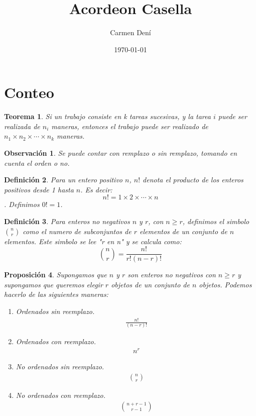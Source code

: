 \documentclass[14pt]{extarticle}
\title{Acordeon Casella}
\author{Carmen Dení}
\date{\today}
\newtheorem{theorem}{Teorema}[section]
\newtheorem{proposition}[theorem]{Proposición}
\newtheorem{definition}[theorem]{Definición}
\newtheorem{remark}{Observación}[section]
\begin{document}
\fontsize{18}{22}\selectfont
\section{Conteo}
\begin{theorem}
    Si un trabajo consiste en k tareas sucesivas, y la tarea $i$ puede ser realizada
    de $n_i$ maneras, entonces el trabajo puede ser realizado de $n_1 \times n_2 \times \cdots \times n_k$ maneras.
\end{theorem}

\begin{remark}
    Se puede contar con remplazo o sin remplazo, tomando en cuenta el orden o no.
\end{remark}

\begin{definition}
Para un entero positivo $n$, $n!$ denota el producto de los enteros positivos desde 1 hasta $n$.
Es decir: $$n! = 1 \times 2 \times \cdots \times n$$.
Definimos $0! = 1$.
\end{definition}

\begin{definition}
    Para enteros no negativos $n$ y $r$, con $n \geq r$, definimos el simbolo $\binom{n}{r}$ como el numero de subconjuntos
    de $r$ elementos de un conjunto de $n$ elementos. Este simbolo se lee "r en n" y se calcula como:
    \[
        \binom{n}{r} = \frac{n!}{r!(n-r)!}
    \]
\end{definition}

\begin{proposition}
    Supongamos que $n$ y $r$ son enteros no negativos con $n \geq r$ y supongamos que queremos elegir $r$ objetos de un conjunto
    de $n$ objetos. Podemos hacerlo de las siguientes maneras:
    \begin{enumerate}
        \item Ordenados sin reemplazo.
        \begin{align*}  
            \frac{n!}{(n-r)!}
        \end{align*}
        \item Ordenados con reemplazo.
        \begin{align*}
            n^r
        \end{align*}
        \item No ordenados sin reemplazo.
        \begin{align*}
            \binom{n}{r}
        \end{align*}
        \item No ordenados con reemplazo.
        \begin{align*}
            \binom{n+r-1}{r-1}
        \end{align*}
    \end{enumerate}
\end{proposition}
\end{document}
